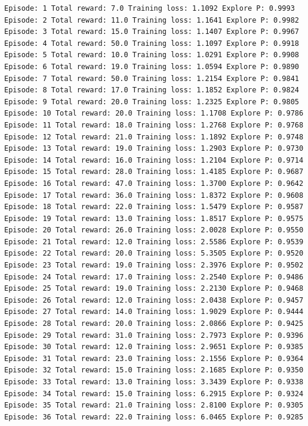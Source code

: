 \documentclass[11pt]{article}
\begin{document}
    \begin{Verbatim}[commandchars=\\\{\}]
Episode: 1 Total reward: 7.0 Training loss: 1.1092 Explore P: 0.9993
Episode: 2 Total reward: 11.0 Training loss: 1.1641 Explore P: 0.9982
Episode: 3 Total reward: 15.0 Training loss: 1.1407 Explore P: 0.9967
Episode: 4 Total reward: 50.0 Training loss: 1.1097 Explore P: 0.9918
Episode: 5 Total reward: 10.0 Training loss: 1.0291 Explore P: 0.9908
Episode: 6 Total reward: 19.0 Training loss: 1.0594 Explore P: 0.9890
Episode: 7 Total reward: 50.0 Training loss: 1.2154 Explore P: 0.9841
Episode: 8 Total reward: 17.0 Training loss: 1.1852 Explore P: 0.9824
Episode: 9 Total reward: 20.0 Training loss: 1.2325 Explore P: 0.9805
Episode: 10 Total reward: 20.0 Training loss: 1.1708 Explore P: 0.9786
Episode: 11 Total reward: 18.0 Training loss: 1.2768 Explore P: 0.9768
Episode: 12 Total reward: 21.0 Training loss: 1.1892 Explore P: 0.9748
Episode: 13 Total reward: 19.0 Training loss: 1.2903 Explore P: 0.9730
Episode: 14 Total reward: 16.0 Training loss: 1.2104 Explore P: 0.9714
Episode: 15 Total reward: 28.0 Training loss: 1.4185 Explore P: 0.9687
Episode: 16 Total reward: 47.0 Training loss: 1.3700 Explore P: 0.9642
Episode: 17 Total reward: 36.0 Training loss: 1.8372 Explore P: 0.9608
Episode: 18 Total reward: 22.0 Training loss: 1.5479 Explore P: 0.9587
Episode: 19 Total reward: 13.0 Training loss: 1.8517 Explore P: 0.9575
Episode: 20 Total reward: 26.0 Training loss: 2.0028 Explore P: 0.9550
Episode: 21 Total reward: 12.0 Training loss: 2.5586 Explore P: 0.9539
Episode: 22 Total reward: 20.0 Training loss: 5.3505 Explore P: 0.9520
Episode: 23 Total reward: 19.0 Training loss: 2.3976 Explore P: 0.9502
Episode: 24 Total reward: 17.0 Training loss: 2.2540 Explore P: 0.9486
Episode: 25 Total reward: 19.0 Training loss: 2.2130 Explore P: 0.9468
Episode: 26 Total reward: 12.0 Training loss: 2.0438 Explore P: 0.9457
Episode: 27 Total reward: 14.0 Training loss: 1.9029 Explore P: 0.9444
Episode: 28 Total reward: 20.0 Training loss: 2.0866 Explore P: 0.9425
Episode: 29 Total reward: 31.0 Training loss: 2.7973 Explore P: 0.9396
Episode: 30 Total reward: 12.0 Training loss: 2.9651 Explore P: 0.9385
Episode: 31 Total reward: 23.0 Training loss: 2.1556 Explore P: 0.9364
Episode: 32 Total reward: 15.0 Training loss: 2.1685 Explore P: 0.9350
Episode: 33 Total reward: 13.0 Training loss: 3.3439 Explore P: 0.9338
Episode: 34 Total reward: 15.0 Training loss: 6.2915 Explore P: 0.9324
Episode: 35 Total reward: 21.0 Training loss: 2.8100 Explore P: 0.9305
Episode: 36 Total reward: 22.0 Training loss: 6.0465 Explore P: 0.9285

\end{Verbatim}
\end{document}
